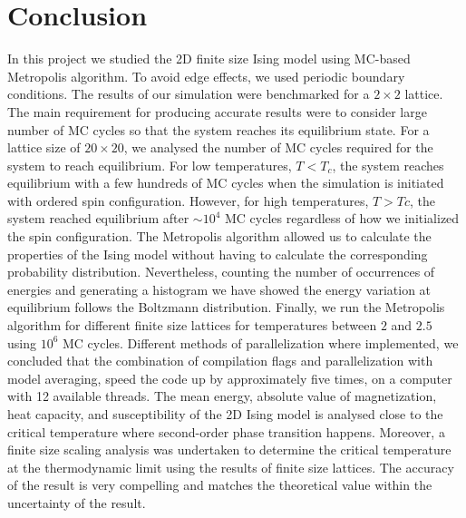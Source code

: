 \documentclass[a4paper]{article}
\begin{document}
\section{Conclusion}
In this project we studied the 2D finite size Ising model using MC-based Metropolis algorithm. To avoid edge effects, we used periodic boundary conditions. The results of our simulation were benchmarked for a $2\times2$ lattice. The main requirement for producing accurate results were to consider large number of MC cycles so that the system reaches its equilibrium state. For a lattice size of $20\times20$, we analysed the number of MC cycles required for the system to reach equilibrium. For low temperatures, $T<T_c$, the system reaches equilibrium with a few hundreds of MC cycles when the simulation is initiated with ordered spin configuration. However, for high temperatures, $T>Tc$, the system reached equilibrium after $\sim 10^4$ MC cycles regardless of how we initialized the spin configuration. The Metropolis algorithm allowed us to calculate the properties of the Ising model without having to calculate the corresponding probability distribution. Nevertheless, counting the number of occurrences of energies and generating a histogram we have showed the energy variation at equilibrium follows the Boltzmann distribution. Finally, we run the Metropolis algorithm for different finite size lattices for temperatures between $2$ and $2.5$ using $10^6$ MC cycles. Different methods of parallelization where implemented, we concluded that the combination of compilation flags and parallelization with model averaging, speed the code up by approximately five times, on a computer with 12 available threads. The mean energy, absolute value of magnetization, heat capacity, and susceptibility of the 2D Ising model is analysed close to the critical temperature where second-order phase transition happens. Moreover, a finite size scaling analysis was undertaken to determine the
critical temperature at the thermodynamic limit using the results of finite size lattices. The accuracy of the result is very compelling and matches the theoretical value within the uncertainty of the result.

%
%


\end{document}

